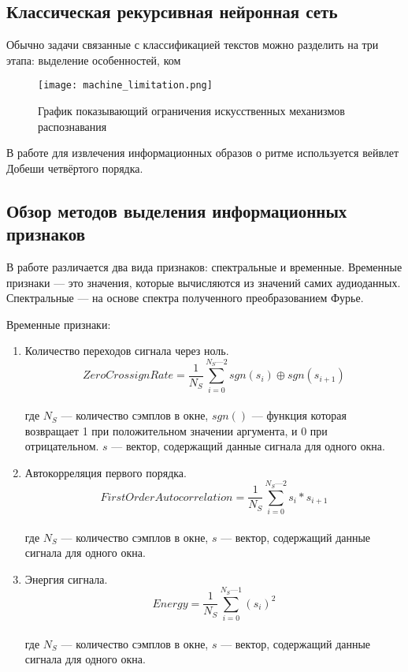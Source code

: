 \subsection{Классическая рекурсивная нейронная сеть}
\label{sub:domain:overview_rnn}
Обычно задачи связанные с классификацией текстов можно разделить на три этапа: выделение особенностей, ком
\begin{figure}[ht]
\centering
  \texttt{[image: machine\_limitation.png]}
  \caption{График показывающий ограничения искусственных механизмов распознавания}
  \label{fig:domain:machine_limitation}
\end{figure}

В работе для извлечения информационных образов о ритме используется вейвлет Добеши четвёртого порядка. 

\subsection{Обзор методов выделения информационных признаков}
\label{sub:domain:feature_extraction}
В работе различается два вида признаков: спектральные и временные. Временные признаки — это значения, которые вычисляются из значений самих аудиоданных. Спектральные —  на основе спектра полученного преобразованием Фурье.

Временные признаки:
\begin{enumerate}[label=\arabic*.]
\item Количество переходов сигнала через ноль.
\begin{equation}\label{eq:zcr}
ZeroCrossignRate =  \frac{1}{N_S} \sum \limits_{i=0}^{N_S — 2} sgn(s_i)  \oplus sgn(s_{i+1})
\end{equation}  
 \\ где $ N_S $ — количество сэмплов в окне, $ sgn() $ — функция которая возвращает 1  при положительном значении аргумента, и 0 при отрицательном.  $ s $ — вектор, содержащий данные сигнала для одного окна. \\
\item Автокорреляция первого порядка.
\begin{equation}\label{eq:autocorrelation}
FirstOrderAutocorrelation =  \frac{1}{N_S} \sum \limits_{i=0}^{N_S — 2} s_i  * s_{i+1}
\end{equation}   \\
где $ N_S $ — количество сэмплов в окне,  $ s $ — вектор, содержащий данные сигнала для одного окна. \\
\item Энергия сигнала.
\begin{equation}\label{eq:energy}
Energy =  \frac{1}{N_S} \sum \limits_{i=0}^{N_S — 1} ( s_i )^2
\end{equation}  \\
где $ N_S $ — количество сэмплов в окне,  $ s $ — вектор, содержащий данные сигнала для одного окна.
\end{enumerate}

